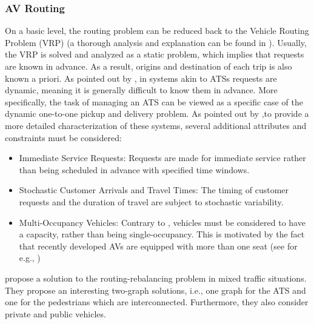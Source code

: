 \subsubsection*{AV Routing}
On a basic level, the routing problem can be reduced back to the Vehicle Routing Problem (VRP) (a thorough analysis and explanation can be found in \cite{doi:10.1137/1.9780898718515}). Usually, the VRP is solved and analyzed as a static problem, which implies that requests are known in advance. As a result, origins and destination of each trip is also known a priori. As pointed out by , in systems akin to ATSs requests are dynamic, meaning it is generally difficult to know them in advance. More specifically, the task of managing an ATS can be viewed as a specific case of the dynamic one-to-one pickup and delivery problem. As pointed out by ,to provide a more detailed characterization of these systems, several additional attributes and constraints must be considered:
\begin{itemize}
	\item Immediate Service Requests: Requests are made for immediate service rather than being scheduled in advance with specified time windows.
	\item Stochastic Customer Arrivals and Travel Times: The timing of customer requests and the duration of travel are subject to stochastic variability.
	\item Multi-Occupancy Vehicles: Contrary to \cite{zhang2016}, vehicles must be considered to have a capacity, rather than being single-occupancy. This is motivated by the fact that recently developed AVs are equipped with more than one seat (see for e.g., \cite{dlr-nemo-bili})
\end{itemize}

 propose a solution to the routing-rebalancing problem in mixed traffic situations. They propose an interesting two-graph solutions, i.e., one graph for the ATS and one for the pedestrians which are interconnected. Furthermore, they also consider private and public vehicles. \\


